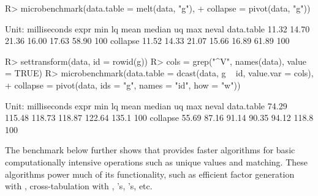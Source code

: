 \documentclass[article]{jss}
\newcommand{\fct}[1]{\code{#1()}}
\begin{document}
\begin{Schunk}
\begin{Soutput}
\end{Soutput}
\begin{Sinput}
R> microbenchmark(data.table = melt(data, "g"),
+                 collapse = pivot(data, "g"))
\end{Sinput}
\begin{Soutput}
Unit: milliseconds
       expr   min    lq  mean median    uq   max neval
 data.table 11.32 14.70 21.36  16.00 17.63 58.90   100
   collapse 11.52 14.33 21.07  15.66 16.89 61.89   100
\end{Soutput}
\begin{Sinput}
R> settransform(data, id = rowid(g))
R> cols = grep("^V", names(data), value = TRUE)
R> microbenchmark(data.table = dcast(data, g ~ id, value.var = cols),
+            collapse = pivot(data, ids = "g", names = "id", how = "w"))
\end{Sinput}
\begin{Soutput}
Unit: milliseconds
       expr   min     lq   mean median     uq   max neval
 data.table 74.29 115.48 118.73 118.87 122.64 135.1   100
   collapse 55.69  87.16  91.14  90.35  94.12 118.8   100
\end{Soutput}
\end{Schunk}
%
The benchmark below further shows that  provides faster algorithms for basic computationally intensive operations such as unique values and matching. These algorithms power much of its functionality, such as efficient factor generation with \fct{qF}, cross-tabulation with \fct{qtab}, \fct{join}'s, \fct{pivot}'s, etc.
%
\end{document}
